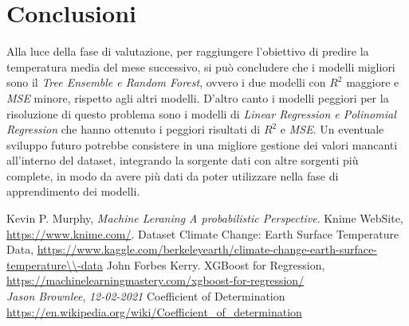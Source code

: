 \documentclass[12pt, a4paper, twocolumn]{article} %
\begin{document}
\section{Conclusioni}
Alla luce della fase di valutazione, per raggiungere l'obiettivo di predire la temperatura media del mese successivo, si può concludere che i modelli migliori sono il \textit{Tree Ensemble e Random Forest}, ovvero i due modelli con $R^{2}$ maggiore e \textit{MSE} minore, rispetto agli altri modelli. D'altro canto i modelli peggiori per la risoluzione di questo problema sono i modelli di \textit{Linear Regression e Polinomial Regression} che hanno ottenuto i peggiori risultati di $R^{2}$ e \textit{MSE}. Un eventuale sviluppo futuro potrebbe consistere in una migliore gestione dei valori mancanti all'interno del dataset, integrando la sorgente dati con altre sorgenti più complete, in modo da avere più dati da poter utilizzare nella fase di apprendimento dei modelli.

\begin{thebibliography}{10}

  Kevin P. Murphy,
  \textit{Machine Leraning A probabilistic Perspective}.
  Knime WebSite,
  \url{https://www.knime.com/}.
	Dataset Climate Change: Earth Surface Temperature Data,
	\url{https://www.kaggle.com/berkeleyearth/climate-change-earth-surface-temperature\\-data}
	John Forbes Kerry.
	XGBoost for Regression,\\
	\url{https://machinelearningmastery.com/xgboost-for-regression/}\\
	\textit{Jason Brownlee},
	\textit{12-02-2021}
	Coefficient of Determination\\
	\url{https://en.wikipedia.org/wiki/Coefficient_of_determination}
\end{thebibliography}

\printbibliography
\end{document}
